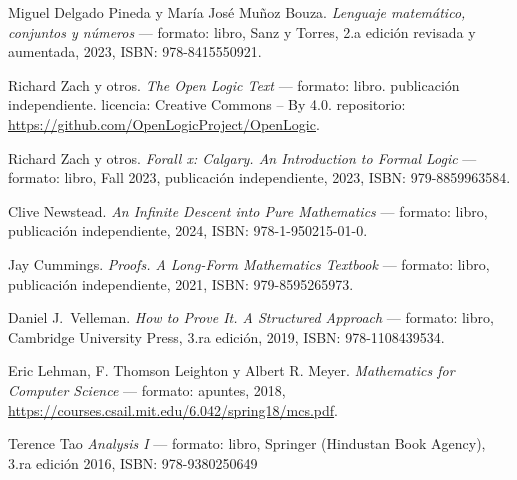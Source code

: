 


\begin{thebibliography}{a}

    Miguel Delgado Pineda y María José Muñoz Bouza.
    \emph{Lenguaje matemático, conjuntos y números}
    ---
    formato: libro,
    Sanz y Torres,
    2.a edición revisada y aumentada,
    2023,
    ISBN: 978-8415550921.

    \foreignlanguage{english}{Richard Zach} y otros.
    \foreignlanguage{english}{\emph{The Open Logic Text}}
    ---
    formato: libro.
    publicación independiente.
    licencia: Creative Commons -- By 4.0.
    repositorio: \url{https://github.com/OpenLogicProject/OpenLogic}.

    \foreignlanguage{english}{Richard Zach} y otros.
    \emph{\foreignlanguage{english}{Forall x: Calgary. An Introduction to Formal Logic}}
    ---
    formato: libro,
    \foreignlanguage{english}{Fall 2023},
    publicación independiente,
    2023,
    ISBN: 979-8859963584.

    \foreignlanguage{english}{Clive Newstead}.
    \emph{\foreignlanguage{english}{An Infinite Descent into Pure Mathematics}}
    ---
    formato: libro,
    publicación independiente,
    2024,
    ISBN: 978-1-950215-01-0.

    \foreignlanguage{english}{Jay Cummings}.
    \emph{\foreignlanguage{english}{Proofs. A Long-Form Mathematics Textbook}}
    ---
    formato: libro,
    publicación independiente,
    2021,
    ISBN: 979-8595265973.

    \foreignlanguage{english}{Daniel J.~Velleman}.
    \emph{\foreignlanguage{english}{How to Prove It. A Structured Approach}}
    ---
    formato: libro,
    Cambridge University Press,
    3.ra edición,
    2019,
    ISBN: 978-1108439534.

    Eric Lehman, F. Thomson Leighton y Albert R. Meyer.
    \emph{Mathematics for Computer Science}
    ---
    formato: apuntes,
    2018,
    \url{https://courses.csail.mit.edu/6.042/spring18/mcs.pdf}.

    Terence Tao
    \emph{Analysis I}
    ---
    formato: libro,
    Springer (Hindustan Book Agency),
    3.ra edición
    2016,
    ISBN: 978-9380250649

\end{thebibliography}







